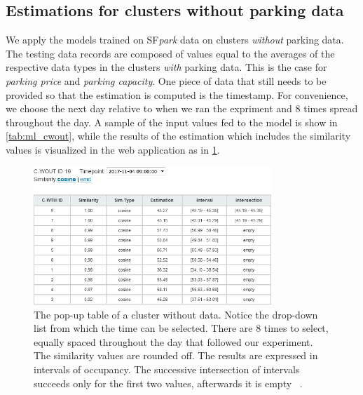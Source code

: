 	\subsection{Estimations for clusters without parking data}
	We apply the models trained on SF\textit{park} data on clusters \textit{without} parking data.
	The testing data records are composed of values equal to the averages of the respective data types in the clusters \textit{with} parking data.
	This is the case for \textit{parking price} and \textit{parking capacity}.
	One piece of data that still needs to be provided so that the estimation is computed is the timestamp.
	For convenience, we choose the next day relative to when we ran the expriment and 8 times spread throughout the day.
	A sample of the input values fed to the model is show in \cref{tab:ml_cwout}, while the results of the estimation which includes the similarity values is visualized in the web application as in \cref{fig:cwout_table}.
	
	\begin{figure}[!ht]
		\centering
		\includegraphics[width=0.8\textwidth]{graphics/cwout_cosine_table.png}
		\caption{The pop-up table of a cluster without data.
			Notice the drop-down list from which the time can be selected. There are 8 times to select, equally spaced throughout the day that followed our experiment. The similarity values are rounded off. The results are expressed in intervals of occupancy. The successive intersection of intervals succeeds only for the first two values, afterwards it is empty ~\protect\cite{web_application}.}
		\label{fig:cwout_table}
	\end{figure}
	
